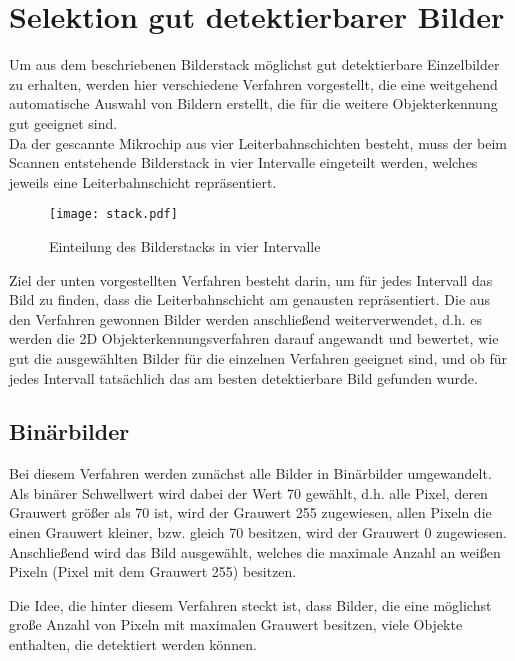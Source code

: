 
\chapter{Selektion gut detektierbarer Bilder}
\label{chap:slk}
	Um aus dem beschriebenen Bilderstack möglichst gut detektierbare Einzelbilder zu erhalten, werden hier verschiedene Verfahren vorgestellt, die eine weitgehend automatische Auswahl von Bildern erstellt, die für die weitere Objekterkennung gut geeignet sind. \\
Da der gescannte Mikrochip aus vier Leiterbahnschichten besteht, muss der beim Scannen entstehende Bilderstack in vier Intervalle eingeteilt werden, welches jeweils eine Leiterbahnschicht repräsentiert. 
\begin{figure}[H]
  \begin{center}
    \texttt{[image: stack.pdf]}
    \caption{Einteilung des Bilderstacks in vier Intervalle}
    \label{fig:intervalls}
  \end{center}
\end{figure}
Ziel der unten vorgestellten Verfahren besteht darin, um für jedes Intervall das Bild zu finden, dass die Leiterbahnschicht am genausten repräsentiert.
Die aus den Verfahren gewonnen Bilder werden anschließend weiterverwendet, d.h. es werden die 2D Objekterkennungsverfahren darauf angewandt und bewertet, wie gut die ausgewählten Bilder für die einzelnen Verfahren geeignet sind, und ob für jedes Intervall tatsächlich das am besten detektierbare Bild gefunden wurde.

\section{Binärbilder}
Bei diesem Verfahren werden zunächst alle Bilder in Binärbilder umgewandelt. Als binärer Schwellwert wird dabei der Wert 70 gewählt, d.h. alle Pixel, deren Grauwert größer als 70 ist, wird der Grauwert 255 zugewiesen, allen Pixeln die einen Grauwert kleiner, bzw. gleich 70 besitzen, wird der Grauwert 0 zugewiesen. Anschließend wird das Bild ausgewählt, welches die maximale Anzahl an weißen Pixeln (Pixel mit dem Grauwert 255) besitzen.

Die Idee, die hinter diesem Verfahren steckt ist, dass Bilder, die eine möglichst große Anzahl von Pixeln mit maximalen Grauwert besitzen, viele Objekte enthalten, die detektiert werden können.

